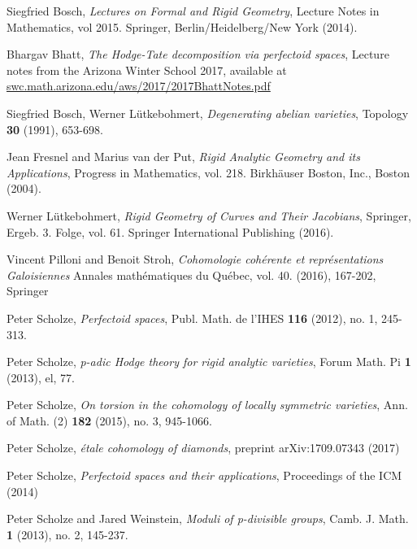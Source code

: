 \documentclass[10pt,oneside]{amsart}
\theoremstyle{definition}
\begin{document}
 
\begin{thebibliography}{99}
	
	Siegfried Bosch,
	\textit{Lectures on Formal and Rigid Geometry}, Lecture Notes in Mathematics, vol 2015. Springer, Berlin/Heidelberg/New York (2014).
	
	Bhargav Bhatt,
	\textit{The Hodge-Tate decomposition via perfectoid spaces}, Lecture notes from the Arizona Winter School 2017, available at \url{swc.math.arizona.edu/aws/2017/2017BhattNotes.pdf}
	
	Siegfried Bosch, Werner L\"utkebohmert,
	\textit{Degenerating abelian varieties}, Topology {\bf 30} (1991), 653-698.
	
	Jean Fresnel and Marius van der Put,
	\textit{Rigid Analytic Geometry and its Applications}, Progress in Mathematics, vol. 218. Birkh\"auser Boston, Inc., Boston (2004).
	
	Werner L\"utkebohmert,
	\textit{Rigid Geometry of Curves and Their Jacobians}, Springer, Ergeb. 3. Folge, vol. 61. Springer International Publishing (2016). 
	
	Vincent Pilloni and  Benoit Stroh,
	\textit{Cohomologie coh{\'e}rente et repr{\'e}sentations Galoisiennes} 
	Annales math{\'e}matiques du Qu{\'e}bec,
		vol. 40. (2016), 167-202, Springer
	
	Peter Scholze,
	\textit{Perfectoid spaces}, Publ. Math. de l'IHES {\bf 116} (2012), no. 1, 245-313.
	
	Peter Scholze,
	\textit{p-adic Hodge theory for rigid analytic varieties}, Forum Math. Pi {\bf 1} (2013), el, 77.
	
	Peter Scholze,
	\textit{On torsion in the cohomology of locally symmetric varieties}, Ann. of Math. (2) {\bf 182} (2015), no. 3, 945-1066.
	
	Peter Scholze,
	\textit{\'etale cohomology of diamonds}, preprint arXiv:1709.07343 (2017)
	
		Peter Scholze,
		\textit{Perfectoid spaces and their applications},
		Proceedings of the ICM (2014)
	
	Peter Scholze and Jared Weinstein,
	\textit{Moduli of p-divisible groups}, Camb. J. Math. {\bf 1} (2013), no. 2, 145-237.
	
\end{thebibliography}

	
	
	
\end{document}
